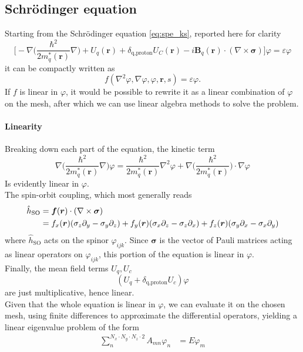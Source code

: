 \subsection{Schr\"odinger equation}
Starting from the Schr\"odinger equation \ref{eq:spe_ks}, reported here for clarity
\begin{equation*}
    \bigg[-\nabla\bigg(\frac{\hbar^2}{2m^{*}_q(\mathbf r)}\nabla \bigg) + U_q(\mathbf r) + \delta_{\text{q,proton}}U_C(\mathbf r)-i\mathbf B_q(\mathbf r)\cdot(\nabla \times \boldsymbol\sigma) \bigg]\varphi=\varepsilon\varphi
\end{equation*}
it can be compactly written as
\begin{equation}
    \label{eq:pde} f(\nabla^2 \varphi, \nabla \varphi, \varphi, \bm r, s) = \varepsilon\varphi.
\end{equation}
If $f$ is linear in $\varphi$, it would be possible to rewrite it as a linear combination of $\varphi$ on the mesh, after which we can use linear algebra methods to solve the problem.
\paragraph{Linearity}
Breaking down each part of the equation, the kinetic term
\begin{equation}
\label{eq:kin_lin_dim}
\nabla\bigg(\frac{\hbar^2}{2m^{*}_q(\mathbf r)}\nabla \bigg)\varphi = \frac{\hbar^2}{2m^{*}_q(\mathbf r)} \nabla^2\varphi + \nabla\bigg(\frac{\hbar^2}{2m^{*}_q(\mathbf r)}\bigg)\cdot \nabla\varphi
\end{equation}
Is evidently linear in $\varphi$. 
\\The spin-orbit coupling, which most generally reads
\begin{align*}
    \hat {{h}}_{\text{SO}}&=\bm f (\bm r )\cdot (\nabla \times \boldsymbol{\sigma} ) 
    \\&=f_x(\bm r)(\sigma_z\partial_y - \sigma_y\partial_z) + f_y(\bm r)(\sigma_x\partial_z - \sigma_z\partial_x) + f_z(\bm r)(\sigma_y\partial_x - \sigma_x\partial_y)
\end{align*}
where $\hat {h}_\text{SO}$ acts on the spinor $\varphi_{ijk}$. Since $\bm \sigma$ is the vector of Pauli matrices acting as linear operators on $\varphi_{ijk}$, this portion of the equation is linear in $\varphi$.
\\Finally, the mean field terms $U_q, U_c$ 
\begin{equation*}
    (U_q + \delta_{\text{q,proton}}U_c)\varphi
\end{equation*}
are just multiplicative, hence linear.
\\Given that the whole equation is linear in $\varphi$, we can evaluate it on the chosen mesh, using finite differences to approximate the differential operators, yielding a linear eigenvalue problem of the form
\begin{align}
    \sum_n^{N_x\cdot N_y\cdot N_z \cdot 2} A_{mn}\varphi_{n} &= E\varphi_m
\end{align}

